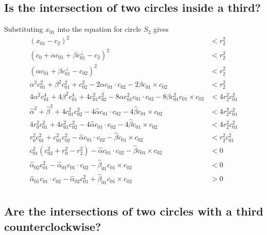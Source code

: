 \documentclass[11pt]{article}
\begin{document}
{\subsection{Is the intersection of two circles inside a third?}

Substituting $x_{01}$ into the equation for circle $S_2$ gives
\begin{align*}
(x_{01} - c_2)^2 &< r_2^2 \\
(c_0 + \alpha c_{01} + \beta c_{01}^\perp - c_2)^2 &< r_2^2 \\
(\alpha c_{01} + \beta c_{01}^\perp - c_{02})^2 &< r_2^2 \\
\alpha^2 c_{01}^2 + \beta^2 c_{01}^2 + c_{02}^2 - 2 \alpha c_{01}\cdot c_{02} - 2 \beta c_{01}\times c_{02} &< r_2^2 \\
4\alpha^2 c_{01}^4 + 4\beta^2 c_{01}^4 + 4c_{01}^2 c_{02}^2 - 8 \alpha c_{01}^2 c_{01}\cdot c_{02} - 8 \beta c_{01}^2 c_{01}\times c_{02} &< 4r_2^2 c_{01}^2 \\
\hat{\alpha}^2 + \hat{\beta}^2 + 4c_{01}^2 c_{02}^2 - 4 \hat{\alpha} c_{01}\cdot c_{02} - 4 \hat{\beta} c_{01}\times c_{02} &< 4r_2^2 c_{01}^2 \\
4 r_0^2 c_{01}^2 + 4 c_{01}^2 c_{02}^2 - 4 \hat{\alpha} c_{01}\cdot c_{02} - 4 \hat{\beta} c_{01}\times c_{02} &< 4r_2^2 c_{01}^2 \\
r_0^2 c_{01}^2 + c_{01}^2 c_{02}^2 - \hat{\alpha} c_{01}\cdot c_{02} - \hat{\beta} c_{01}\times c_{02} &< r_2^2 c_{01}^2 \\
c_{01}^2 (c_{02}^2 + r_0^2 - r_2^2) - \hat{\alpha} c_{01}\cdot c_{02} - \hat{\beta} c_{01}\times c_{02} &< 0 \\
\hat{\alpha}_{02} c_{01}^2 - \hat{\alpha}_{01} c_{01}\cdot c_{02} - \hat{\beta}_{01} c_{01}\times c_{02} &< 0 \\
\hat{\alpha}_{01} c_{01}\cdot c_{02} - \hat{\alpha}_{02} c_{01}^2 + \hat{\beta}_{01} c_{01}\times c_{02} &> 0 \\
\end{align*}

\subsection{Are the intersections of two circles with a third counterclockwise?}

}
\end{document}
